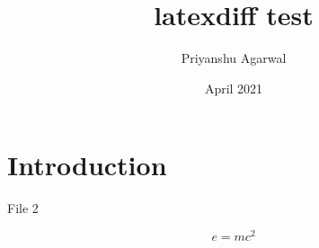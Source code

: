 \documentclass{article}
\title{latexdiff test}
\author{Priyanshu Agarwal}
\date{April 2021}
\begin{document}
\maketitle

\section{Introduction}

File 2

\begin{equation}
    e = mc^2
\end{equation}
\end{document}
